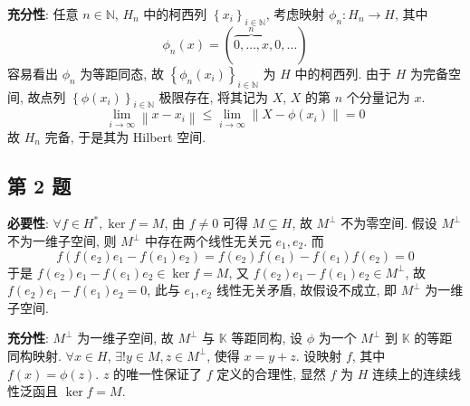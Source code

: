 \documentclass[\ROOT/main.tex]{subfiles}
\begin{document}
\noindent \textbf{充分性}:
任意 $n \in \mathbb{N}$, $H_n$ 中的柯西列 $\left\{ x_i \right\}_{i \in \mathbb{N}}$,
考虑映射 $\phi_n : H_n \to H$, 其中
\[
    \phi_n \left( x \right)
    = ( \overbrace{0, \dots, x}^n, 0, \dots )
\]
容易看出 $\phi_n$ 为等距同态,
故 $\left\{ \phi_n \left( x_i \right) \right\}_{i \in \mathbb{N}}$ 为 $H$ 中的柯西列.
由于 $H$ 为完备空间, 故点列 $\left\{ \phi \left( x_i \right) \right\}_{i \in \mathbb{N}}$ 极限存在,
将其记为 $X$, $X$ 的第 $n$ 个分量记为 $x$.
\[
    \lim_{i \to \infty} \left\| x - x_i \right\|
    \leqslant \lim_{i \to \infty} \left\| X - \phi \left( x_i \right) \right\|
    = 0
\]
故 $H_n$ 完备, 于是其为 Hilbert 空间.

\subsection{第 2 题}
\noindent \textbf{必要性}:
$\forall f \in H^*, \ker f = M$, 由 $f \neq 0$ 可得 $M \subsetneq H$, 故 $M^\bot$ 不为零空间.
假设 $M^\bot$ 不为一维子空间, 则 $M^\bot$ 中存在两个线性无关元 $e_1, e_2$.
而
\[
    f\left( f \left( e_2 \right) e_1 - f \left( e_1 \right) e_2 \right)
    = f \left( e_2 \right) f \left( e_1 \right) - f \left( e_1 \right) f \left( e_2 \right)
    = 0
\]
于是 $f \left( e_2 \right) e_1 - f \left( e_1 \right) e_2 \in \ker f = M$, 又 $f \left( e_2 \right) e_1 - f \left( e_1 \right) e_2 \in M^\bot$,
故 $f \left( e_2 \right) e_1 - f \left( e_1 \right) e_2 = 0$, 此与 $e_1, e_2$ 线性无关矛盾,
故假设不成立, 即 $M^\bot$ 为一维子空间.

\noindent \textbf{充分性}:
$M^\bot$ 为一维子空间, 故 $M^\bot$ 与 $\mathbb{K}$ 等距同构, 设 $\phi$ 为一个 $M^\bot$ 到 $\mathbb{K}$ 的等距同构映射.
$\forall x \in H$, $\exists! y \in M, z \in M^\bot$, 使得 $x = y + z$.
设映射 $f$, 其中 $f \left( x \right) = \phi \left( z \right)$.
$z$ 的唯一性保证了 $f$ 定义的合理性, 显然 $f$ 为 $H$ 连续上的连续线性泛函且 $\ker f = M$.
\end{document}
